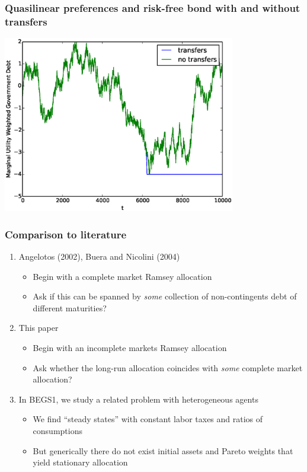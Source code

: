 \documentclass{beamer}
\begin{document}
 \begin{frame}
	\frametitle{Quasilinear preferences and risk-free bond  with and without transfers}
	\begin{center}
	\includegraphics[width=4in]{Images/transfer_example2.eps}
	\end{center}
\end{frame}



\begin{frame}
 \frametitle{Comparison to literature}
 \begin{enumerate}
  \item Angelotos (2002), Buera and Nicolini (2004)

\begin{itemize}
 \item Begin with a complete market  Ramsey allocation
 \item Ask if this can be spanned by \emph{some} collection of non-contingents debt of different maturities?
\end{itemize}
\item This paper
\begin{itemize}
 \item Begin with an incomplete markets Ramsey allocation
 \item Ask whether the long-run allocation coincides with \emph{some} complete market allocation?
\end{itemize}

\item In BEGS1, we study a related problem with heterogeneous agents
\begin{itemize}
 \item We find ``steady states'' with constant labor taxes and ratios of consumptions
 \item But generically there do not exist initial assets and Pareto weights that  yield  stationary allocation
\end{itemize}



 \end{enumerate}


\end{frame}
\end{document}
